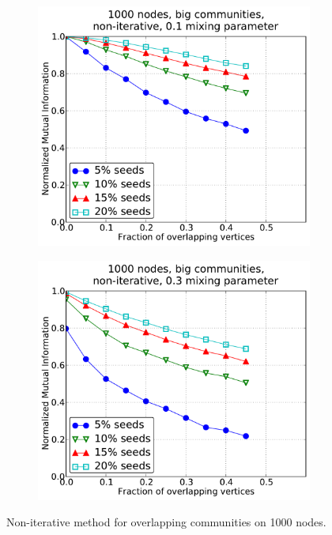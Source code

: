 \begin{figure}[h!]
\begin{subfigure}{0.5\textwidth}
    \end{subfigure}
    \begin{subfigure}{0.5\textwidth}
    \centering
    \includegraphics[width=\appplotwidth]{plots/overlap_noniter_1mu_b.pdf}
    \end{subfigure}%
    \begin{subfigure}{0.5\textwidth}
    \centering
    \includegraphics[width=\appplotwidth]{plots/overlap_noniter_3mu_b.pdf}
    \end{subfigure}
    \caption{Non-iterative method for overlapping communities on 1000 nodes.}\label{fig:no_iter_overlap_1000N}
\end{figure}
